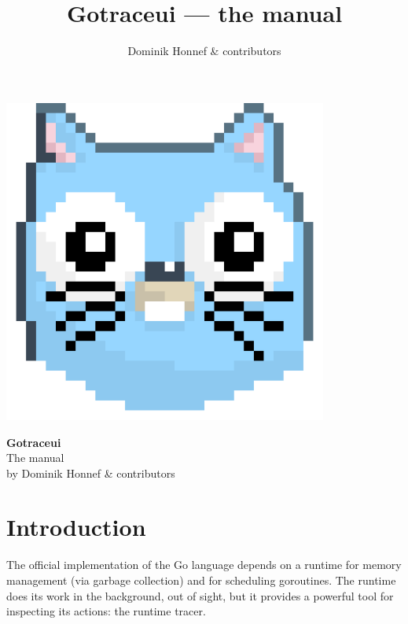 \documentclass[10pt,letterpaper,oneside,openany,english]{memoir}
\title{Gotraceui --- the manual}
\author{Dominik Honnef \& contributors}
\begin{document}
\frontmatter

\begin{titlingpage}
\centering
\includegraphics[width=0.8\textwidth]{./images/logo}

\begin{vplace}
{\HUGE\bfseries Gotraceui}\\[\baselineskip]
{\Huge The manual}\\[2\baselineskip]
{by Dominik Honnef \& contributors}\\
\end{vplace}
\end{titlingpage}

\enlargethispage{2\baselineskip}
\tableofcontents
{}

\mainmatter


\chapter{Introduction}

The official implementation of the Go language depends on a runtime for memory management (via garbage collection) and for scheduling goroutines.
The runtime does its work in the background, out of sight, but it provides a powerful tool for inspecting its actions: the runtime tracer.
\end{document}
